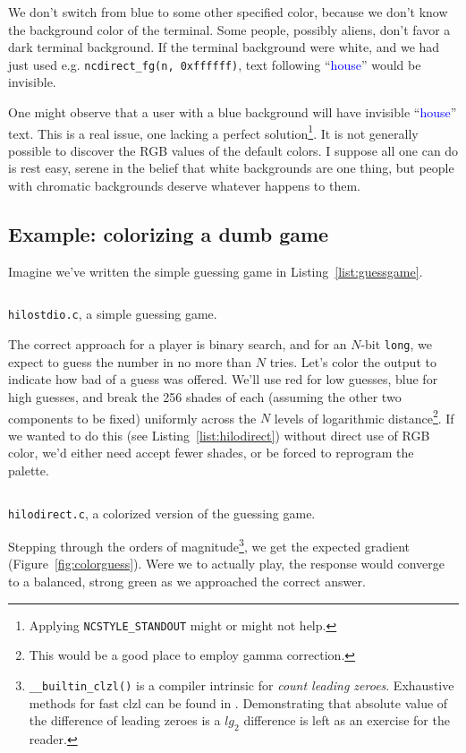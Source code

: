 \documentclass[letterpaper,10pt]{article}
\begin{document}
We don't switch from blue to some other specified color, because we don't know
the background color of the terminal. Some people, possibly aliens, don't favor
a dark terminal background. If the terminal background were white, and we had
just used e.g. \texttt{ncdirect\_fg(n, 0xffffff)}, text following
``\textcolor{blue}{house}'' would be invisible.

One might observe that a user with a blue background will have invisible
``\textcolor{blue}{house}'' text. This is a real issue, one lacking a perfect
solution\footnote{Applying \texttt{NCSTYLE\_STANDOUT} might or might not help.}.
It is not generally possible to discover the RGB values of the default colors.
I suppose all one can do is rest easy, serene in the belief that white
backgrounds are one thing, but people with chromatic backgrounds deserve
whatever happens to them.

\subsection{Example: colorizing a dumb game}
Imagine we've written the simple guessing game in Listing~\ref{list:guessgame}.

\begin{listing}[!htb]
\inputminted[]{C}{code/hilostdio.c}
\caption{\texttt{hilostdio.c}, a simple guessing game.}
\label{list:guessgame}
\end{listing}

The correct approach for a player is binary search, and for an $N$-bit
\texttt{long}, we expect to guess the number in no more than $N$ tries. Let's
color the output to indicate how bad of a guess was offered. We'll use red for
low guesses, blue for high guesses, and break the 256 shades of each (assuming
the other two components to be fixed) uniformly across the $N$ levels of
logarithmic distance\footnote{This would be a good place to employ \gls{gamma correction}.}.
If we wanted to do this (see Listing~\ref{list:hilodirect}) without direct use of RGB color,
we'd either need accept fewer shades, or be forced to reprogram the palette.

\begin{listing}[!htb]
\inputminted[]{C}{code/hilodirect.c}
\caption{\texttt{hilodirect.c}, a colorized version of the guessing game.}
\label{list:hilodirect}
\end{listing}

Stepping through the orders of magnitude\footnote{\texttt{\_\_builtin\_clzl()}
is a compiler intrinsic for \textit{count leading zeroes}. Exhaustive methods
for fast clzl can be found in \cite{hackerdelight}. Demonstrating that
absolute value of the difference of leading zeroes is a $lg_{2}$ difference
is left as an exercise for the reader.}, we get the expected gradient
(Figure~\ref{fig:colorguess}). Were we to actually play, the response would
converge to a balanced, strong green as we approached the correct answer.
\end{document}
